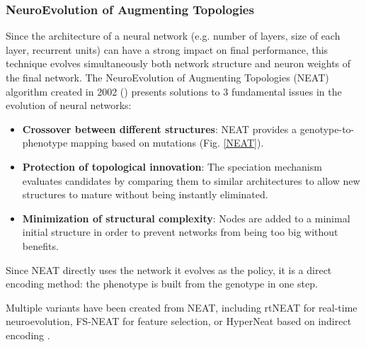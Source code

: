 \bigbreak

\subsubsection{NeuroEvolution of Augmenting Topologies}

Since the architecture of a neural network (e.g. number of layers, size of each layer, recurrent units) can have a strong impact on final performance, this technique evolves simultaneously both network structure and neuron weights of the final network. The NeuroEvolution of Augmenting Topologies (NEAT) algorithm created in 2002 (\cite{NEAT_1, NEAT_2}) presents solutions to 3 fundamental issues in the evolution of neural networks:



\begin{itemize}
    \item \textbf{Crossover between different structures}: NEAT provides a genotype-to-phenotype mapping based on mutations (Fig. \ref{NEAT}).
    \item \textbf{Protection of topological innovation}: The speciation mechanism evaluates candidates by comparing them to similar architectures to allow new structures to mature without being instantly eliminated. 
    \item \textbf{Minimization of structural complexity}: Nodes are added to a minimal initial structure in order to prevent networks from being too big without benefits.
\end{itemize}
\bigbreak


Since NEAT directly uses the network it evolves as the policy, it is a direct encoding method: the phenotype is built from the genotype in one step.

Multiple variants have been created from NEAT, including rtNEAT \cite{rtNEAT} for real-time neuroevolution, FS-NEAT \cite{FS-NEAT} for feature selection, or HyperNeat based on indirect encoding \cite{HyperNEAT}.

